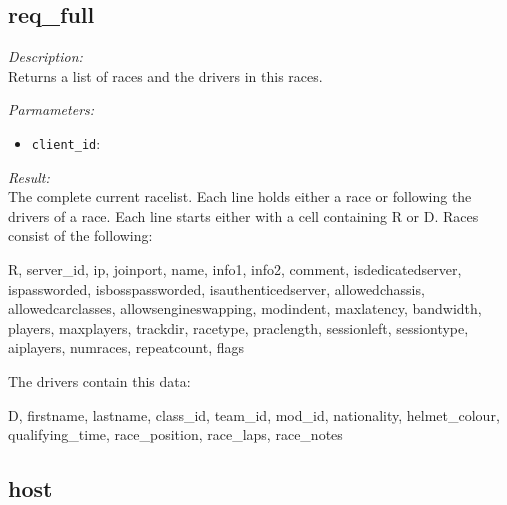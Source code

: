 \subsection{req\_full}

\begin{description}
\item {\it Description:}\\
Returns a list of races and the drivers in this races.
\item {\it Parmameters:}
\begin{itemize}
\item {\tt client\_id}: 
\end{itemize}
\item {\it Result:}\\
The complete current racelist. Each line holds either a race or following the drivers of a race. Each line starts either with a cell containing R or D. Races consist of the following: 
		
	R, 
	server\_id, 
	ip, 
	joinport, 
	name, 
	info1, 
	info2, 
	comment, 
	isdedicatedserver, 
	ispassworded, 
	isbosspassworded, 
	isauthenticedserver, 
	allowedchassis, 
	allowedcarclasses, 
	allowsengineswapping, 
	modindent, 
	maxlatency, 
	bandwidth, 
	players,
	maxplayers, 
	trackdir, 
	racetype, 
	praclength, 
	sessionleft, 
	sessiontype,
	aiplayers,
	numraces,
	repeatcount,
	flags


	The drivers contain this data:

	D,
	firstname,
	lastname,
	class\_id,
	team\_id,
	mod\_id,
	nationality,
	helmet\_colour,
	qualifying\_time,
	race\_position,
	race\_laps,
	race\_notes
	
\end{description}

\subsection{host}

